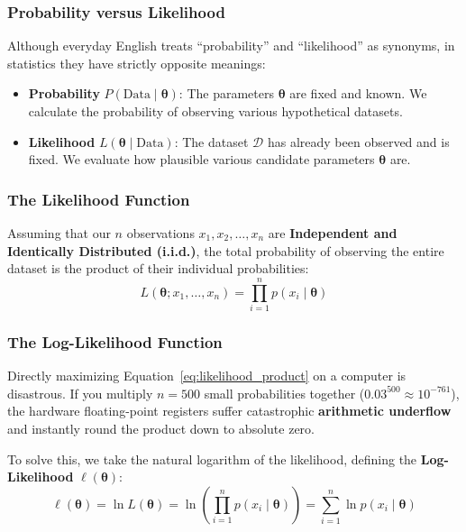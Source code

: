 \subsubsection{Probability versus Likelihood}
Although everyday English treats ``probability'' and ``likelihood'' as synonyms, in statistics they have strictly opposite meanings:
\begin{itemize}
    \item \textbf{Probability} $P(\text{Data} \mid \mathbf{\theta})$: The parameters $\mathbf{\theta}$ are fixed and known. We calculate the probability of observing various hypothetical datasets.
    \item \textbf{Likelihood} $L(\mathbf{\theta} \mid \text{Data})$: The dataset $\mathcal{D}$ has already been observed and is fixed. We evaluate how plausible various candidate parameters $\mathbf{\theta}$ are.
\end{itemize}

\subsubsection{The Likelihood Function}
Assuming that our $n$ observations $x_1, x_2, \dots, x_n$ are \textbf{Independent and Identically Distributed (i.i.d.)}, the total probability of observing the entire dataset is the product of their individual probabilities:
\begin{equation}
L(\mathbf{\theta}; x_1, \dots, x_n) = \prod_{i=1}^{n} p(x_i \mid \mathbf{\theta})\label{eq:likelihood_product}
\end{equation}

\subsubsection{The Log-Likelihood Function}
Directly maximizing Equation~\eqref{eq:likelihood_product} on a computer is disastrous. If you multiply $n = 500$ small probabilities together ($0.03^{500} \approx 10^{-761}$), the hardware floating-point registers suffer catastrophic \textbf{arithmetic underflow} and instantly round the product down to absolute zero.

To solve this, we take the natural logarithm of the likelihood, defining the \textbf{Log-Likelihood} $\ell(\mathbf{\theta})$:
\begin{equation}
\ell(\mathbf{\theta}) = \ln L(\mathbf{\theta}) = \ln \left( \prod_{i=1}^{n} p(x_i \mid \mathbf{\theta}) \right) = \sum_{i=1}^{n} \ln p(x_i \mid \mathbf{\theta})\label{eq:log_likelihood_sum}
\end{equation}

